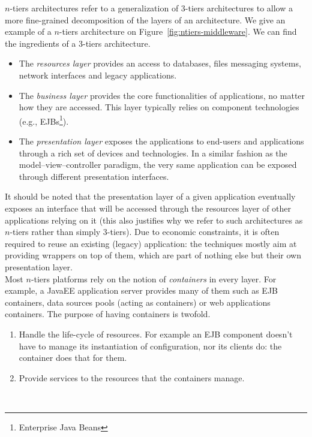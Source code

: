 $n$-tiers architectures refer to a generalization of 3-tiers architectures to allow a more fine-grained decomposition of the layers of an architecture. We give an example of a $n$-tiers architecture on Figure~\ref{fig:ntiers-middleware}. We can find the ingredients of a 3-tiers architecture.
\begin{itemize}
  
  \item The \emph{resources layer} provides an access to databases, files messaging systems, network interfaces and legacy applications.
  
  \item The \emph{business layer} provides the core functionalities of applications, no matter how they are accessed. This layer typically relies on component technologies (e.g., EJBs\footnote{Enterprise Java Beans}).
  
  \item The \emph{presentation layer} exposes the applications to end-users and applications through a rich set of devices and technologies. In a similar fashion as the model--view--controller paradigm, the very same application can be exposed through different presentation interfaces.
  
\end{itemize}
It should be noted that the presentation layer of a given application eventually exposes an interface that will be accessed through the resources layer of other applications relying on it (this also justifies why we refer to such architectures as $n$-tiers rather than simply 3-tiers). Due to economic constraints, it is often required to reuse an existing (legacy) application: the techniques mostly aim at providing wrappers on top of them, which are part of nothing else but their own presentation layer.\\

Most $n$-tiers platforms rely on the notion of \emph{containers} in every layer. For example, a JavaEE application server provides many of them such as EJB containers, data sources pools (acting as containers) or web applications containers. The purpose of having containers is twofold.
\begin{enumerate}
  
  \item Handle the life-cycle of resources. For example an EJB component doesn't have to manage its instantiation of configuration, nor its clients do: the container does that for them.
  
  \item Provide services to the resources that the containers manage.
  
\end{enumerate}\


